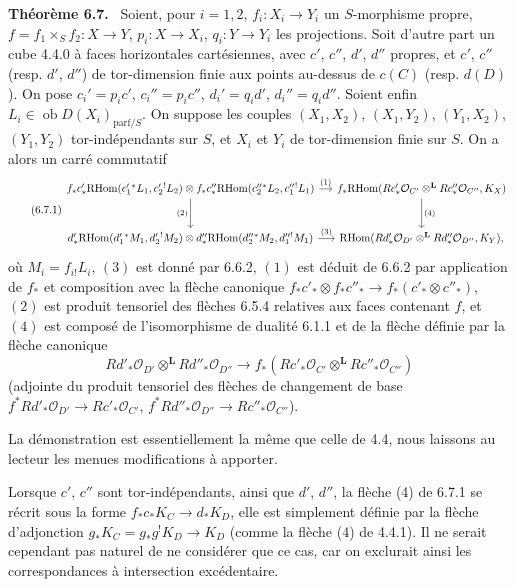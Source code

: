 \documentclass[11pt]{article}
\providecommand{\cO}{\mathcal{O}}
\newenvironment{statement}[1]{\par\medskip\noindent\textbf{#1.}\ }{\par\medskip}
\providecommand{\RHom}{\mathrm{RHom}}
\providecommand{\RHom}{\mathrm{RHom}}
\providecommand{\RHom}{\mathrm R\mathcal{H}om}
\begin{document}
\begin{statement}{Théorème 6.7}
Soient, pour $i=1,2$, $f_i:X_i\to Y_i$ un $S$-morphisme propre, $f=f_1\times_Sf_2:X\to Y$, $p_i:X\to X_i$, $q_i:Y\to Y_i$ les projections. Soit d'autre part un cube 4.4.0 à faces horizontales cartésiennes, avec $c'$, $c''$, $d'$, $d''$ propres, et $c'$, $c''$ (resp. $d'$, $d''$) de tor-dimension finie aux points au-dessus de $c(C)$ (resp. $d(D)$). On pose $c_i'=p_ic'$, $c_i''=p_ic''$, $d_i'=q_id'$, $d_i''=q_id''$. Soient enfin $L_i\in\operatorname{ob}D(X_i)_{\mathrm{parf}/S}$. On suppose les couples $(X_1,X_2)$, $(X_1,Y_2)$, $(Y_1,X_2)$, $(Y_1,Y_2)$ tor-indépendants sur $S$, et $X_i$ et $Y_i$ de tor-dimension finie sur $S$. On a alors un carré commutatif
\begin{equation}
\tag{6.7.1}
\begin{tikzcd}[column sep=small,row sep=large]
f_*c'_*\RHom(c_1'{}^*L_1,c_2'{}^!L_2)\otimes f_*c''_*\RHom(c_2''{}^*L_2,c_1''{}^!L_1) \arrow[r,"(1)"] \arrow[d,"(2)"']
& f_*\RHom(Rc'_*\cO_{C'}\otimes^{\mathbf L}Rc''_*\cO_{C''},K_X) \arrow[d,"(4)"] \\
d'_*\RHom(d_1'{}^*M_1,d_2'{}^!M_2)\otimes d''_*\RHom(d_2''{}^*M_2,d_1''{}^!M_1) \arrow[r,"(3)"]
& \RHom(Rd'_*\cO_{D'}\otimes^{\mathbf L}Rd''_*\cO_{D''},K_Y),
\end{tikzcd}
\end{equation}
où $M_i=f_{i!}L_i$, $(3)$ est donné par 6.6.2, $(1)$ est déduit de 6.6.2 par application de $f_*$ et composition avec la flèche canonique $f_*c'_*\otimes f_*c''_*\to f_*(c'_*\otimes c''_*)$, $(2)$ est produit tensoriel des flèches 6.5.4 relatives aux faces contenant $f$, et $(4)$ est composé de l'isomorphisme de dualité 6.1.1 et de la flèche définie par la flèche canonique
\[
Rd'_*\cO_{D'}\otimes^{\mathbf L}Rd''_*\cO_{D''}\longrightarrow f_*(Rc'_*\cO_{C'}\otimes^{\mathbf L}Rc''_*\cO_{C''})
\]
(adjointe du produit tensoriel des flèches de changement de base $f^*Rd'_*\cO_{D'}\to Rc'_*\cO_{C'}$, $f^*Rd''_*\cO_{D''}\to Rc''_*\cO_{C''}$).
\end{statement}

La démonstration est essentiellement la même que celle de 4.4, nous laissons au lecteur les menues modifications à apporter.

Lorsque $c'$, $c''$ sont tor-indépendants, ainsi que $d'$, $d''$, la flèche (4) de 6.7.1 se récrit sous la forme $f_*c_*K_C\to d_*K_D$, elle est simplement définie par la flèche d'adjonction $g_*K_C=g_*g^!K_D\to K_D$ (comme la flèche (4) de 4.4.1). Il ne serait cependant pas naturel de ne considérer que ce cas, car on exclurait ainsi les correspondances à intersection excédentaire.
\end{document}
